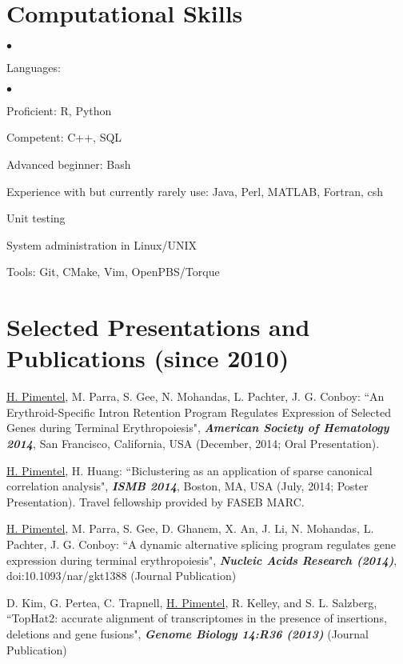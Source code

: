 \documentclass[margin,line]{res}
\newenvironment{list2}{
  \begin{list}{$\bullet$}{%
      \setlength{\itemsep}{0in}
      \setlength{\parsep}{0in} \setlength{\parskip}{0in}
      \setlength{\topsep}{0in} \setlength{\partopsep}{0in}
      \setlength{\leftmargin}{0.2in}}}{\end{list}}
\begin{document}
\begin{resume}
\section{\sc Computational Skills}
\begin{list2}
\item Languages:
  \begin{list2}
    \item Proficient: R, Python
    \item Competent: C++, SQL
    \item Advanced beginner: Bash
    \item Experience with but currently rarely use: Java, Perl, MATLAB, Fortran, csh
  \end{list2}
\item Unit testing
\item System administration in Linux/UNIX
\item Tools: Git, CMake, Vim, OpenPBS/Torque\\
\end{list2}
\vspace{-.65cm}

\section{\sc Selected Presentations and Publications (since 2010)}

\underline{H. Pimentel}, M. Parra, S. Gee, N. Mohandas, L. Pachter, J. G.
Conboy: ``An Erythroid-Specific Intron Retention Program Regulates Expression
of Selected Genes during Terminal Erythropoiesis", {\bf \emph{American Society
    of Hematology 2014}}, San Francisco, California, USA (December, 2014; Oral
Presentation).

\underline{H. Pimentel}, H. Huang: ``Biclustering as an application of sparse
canonical correlation analysis", {\bf \emph{ISMB 2014}}, Boston, MA, USA (July,
2014; Poster Presentation). Travel fellowship provided by FASEB MARC.

\underline{H. Pimentel}, M. Parra, S. Gee, D. Ghanem, X. An, J. Li, N.
Mohandas, L. Pachter, J. G. Conboy: ``A dynamic alternative splicing program
regulates gene expression during terminal erythropoiesis", {\bf \emph{Nucleic
    Acids Research (2014)}}, doi:10.1093/nar/gkt1388 (Journal Publication)

D. Kim, G. Pertea, C. Trapnell, \underline{H. Pimentel}, R. Kelley, and S.
L. Salzberg, ``TopHat2: accurate alignment of transcriptomes in the presence of
insertions, deletions and gene fusions", {\bf \emph{Genome Biology
    14:R36 (2013)}} (Journal Publication)


\end{resume}
\end{document}
